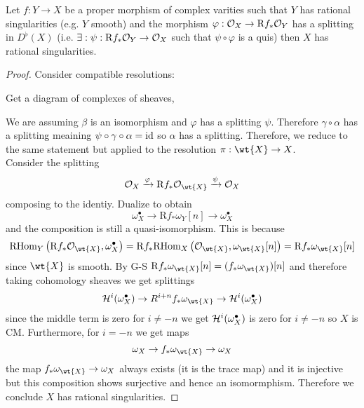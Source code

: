 \documentclass[12pt]{article}
\newcommand{\R}{\mathrm{R}}
\begin{document}
\begin{theorem}[Kov\'{a}cs]
Let $f : Y \to X$ be a proper morphism of complex varities such that $Y$ has rational singularities (e.g. $Y$ smooth) and the morphism $\varphi : \struct{X} \to \R f_* \struct{Y}$ has a splitting in $D^\flat(X)$ (i.e. $\exists : \psi : \R f_* \struct{Y} \to \struct{X}$ such that $\psi \circ \varphi$ is a quis) then $X$ has rational singularities. 
\end{theorem}

\begin{proof}
Consider compatible resolutions:
\begin{center}
\end{center}
Get a diagram of complexes of sheaves,
\begin{center}
\end{center}
We are assuming $\beta$ is an isomorphism and $\varphi$ has a splitting $\psi$. Therefore $\gamma \circ \alpha$ has a splitting meaining $\psi \circ \gamma \circ \alpha = \mathrm{id}$ so $\alpha$ has a splitting. Therefore, we reduce to the same statement but applied to the resolution $\pi : \wt{X} \to X$. 
\bigskip\\
Consider the splitting
\[ \struct{X} \xrightarrow{\varphi} \R f_* \struct{\wt{X}} \xrightarrow{\psi} \struct{X} \]
composing to the identiy. Dualize to obtain
\[ \omega_X^\bullet \to \R f_* \omega_Y[n] \to \omega_X^\bullet \]
and the composition is still a quasi-isomorphism. This is because
\[ \RHom{Y}{\R f_* \struct{\wt{X}}}{\omega_X^\bullet} = \R f_* \RHom{X}{\struct{\wt{X}}}{\omega_{\wt{X}}[n]} = \R f_* \omega_{\wt{X}} [n] \]
since $\wt{X}$ is smooth. By G-S $\R f_* \omega_{\wt{X}}[n] = (f_* \omega_{\wt{X}})[n]$ and therefore taking cohomology sheaves we get splittings
\[ \cH^i(\omega_X^\bullet) \to R^{i+n} f_* \omega_{\wt{X}} \to \cH^i(\omega_X^\bullet) \]
since the middle term is zero for $i \neq -n$ we get $\mathcal{H}^i(\omega_X^\bullet)$ is zero for $i \neq -n$ so $X$ is CM. Furthermore, for $i = -n$ we get maps
\[ \omega_X \to f_* \omega_{\wt{X}} \to \omega_X \] 
the map $f_* \omega_{\wt{X}} \to \omega_X$ always exists (it is the trace map) and it is injective but this composition shows surjective and hence an isomormphism. Therefore we conclude $X$ has rational singularities. 
\end{proof}
\end{document}
